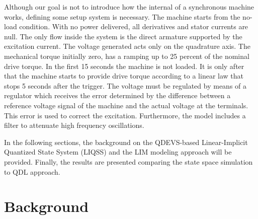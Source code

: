 \documentclass{article}
\theoremstyle{scsthe}
\begin{document}
Although our goal is not to introduce how the internal of a synchronous machine works, defining some setup system is necessary. The machine starts from the no-load condition. With no power delivered, all derivatives and stator currents are null. The only flow inside the system is the direct armature supported by the excitation current. The voltage generated acts only on the quadrature axis. The mechanical torque initially zero, has a ramping up to 25 percent of the nominal drive torque. In the first 15 seconds the machine is not loaded. It is only after that the machine starts to provide drive torque according to a linear law that stops 5 seconds after the trigger. The voltage must be regulated by means of a regulator which receives the error determined by the difference between a reference voltage signal of the machine and the actual voltage at the terminals. This error is used to correct the excitation. Furthermore, the model includes a filter to attenuate high frequency oscillations.

In the following sections, the background on the QDEVS-based Linear-Implicit Quantized State System (LIQSS) and the LIM modeling approach will be provided. Finally, the results are presented comparing the state space simulation to QDL approach. 

\section{Background}
\end{document}
